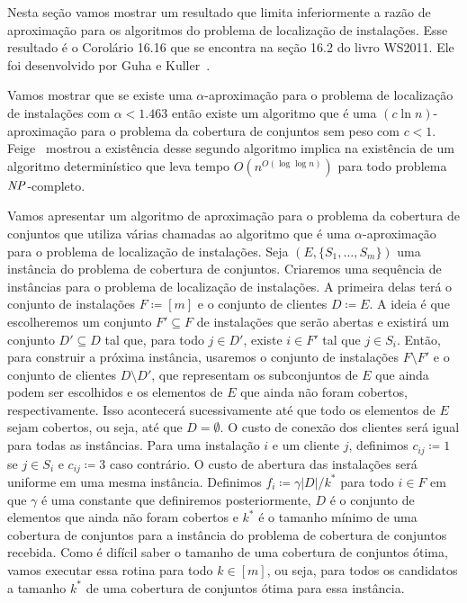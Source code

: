 Nesta seção vamos mostrar um resultado que limita inferiormente a razão de aproximação para os algoritmos do problema de localização de instalações. Esse resultado é o Corolário 16.16 que se encontra na seção 16.2 do livro WS2011. Ele foi desenvolvido por Guha e Kuller~\cite{GUHA1999228}.

Vamos mostrar que se existe uma $\alpha$-aproximação para o problema de localização de instalações com $\alpha < 1.463$ então existe um algoritmo que é uma $(c \ln n)$-aproximação para o problema da cobertura de conjuntos sem peso com $c<1$. 
Feige~\cite{Feige98} mostrou a existência desse segundo algoritmo implica na existência de um algoritmo determinístico que leva tempo $O(n^{O(\log\log n)})$ para todo problema $\mathit{NP}$-completo.

Vamos apresentar um algoritmo de aproximação para o problema da cobertura de conjuntos que utiliza várias chamadas ao algoritmo que é uma $\alpha$-aproximação para o problema de localização de instalações. 
Seja $(E,\{S_1,\ldots,S_m\})$ uma instância do problema de cobertura de conjuntos. Criaremos uma sequência de instâncias para o problema de localização de instalações. 
A primeira delas terá o conjunto de instalações $F \coloneqq [m]$ e o conjunto de clientes $D \coloneqq E$. 
A ideia é que escolheremos um conjunto $F' \subseteq F$ de instalações que serão abertas e existirá um conjunto $D' \subseteq D$ tal que, para todo $j \in D'$, existe $i \in F'$ tal que $j \in S_i$. 
Então, para construir a próxima instância, usaremos o conjunto de instalações $F \setminus F'$ e o conjunto de clientes $D \setminus D'$, que representam os subconjuntos de $E$ que ainda podem ser escolhidos e os elementos de $E$ que ainda não foram cobertos, respectivamente. 
Isso acontecerá sucessivamente até que todo os elementos de $E$ sejam cobertos, ou seja, até que $D = \emptyset$.
O custo de conexão dos clientes será igual para todas as instâncias. Para uma instalação $i$ e um cliente $j$, definimos $c_{ij}\coloneqq 1$ se $j \in S_i$ e $c_{ij} \coloneqq 3$ caso contrário.
O custo de abertura das instalações será uniforme em uma mesma instância. Definimos $f_i \coloneqq \gamma |D|/k^*$ para todo $i\in F$ em que $\gamma$ é uma constante que definiremos posteriormente, $D$ é o conjunto de elementos que ainda não foram cobertos e $k^*$ é o tamanho mínimo de uma cobertura de conjuntos para a instância do problema de cobertura de conjuntos recebida. Como é difícil saber o tamanho de uma cobertura de conjuntos ótima, vamos executar essa rotina para todo $k \in [m]$, ou seja, para todos os candidatos a tamanho $k^*$ de uma cobertura de conjuntos ótima para essa instância.

